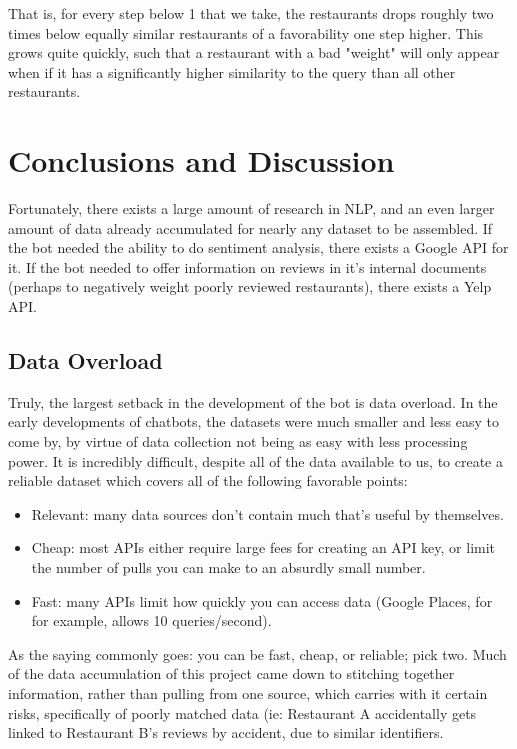 \documentclass{article}
\begin{document}
        That is, for every step below 1 that we take, the restaurants drops roughly two times below equally similar restaurants of a favorability one step higher. This grows quite quickly, such that a restaurant with a bad "weight" will only appear when if it has a significantly higher similarity to the query than all other restaurants.
    
\section{Conclusions and Discussion}
    Fortunately, there exists a large amount of research in NLP, and an even larger amount of data already accumulated for nearly any dataset to be assembled. If the bot needed the ability to do sentiment analysis, there exists a Google API for it. If the bot needed to offer information on reviews in it's internal documents (perhaps to negatively weight poorly reviewed restaurants), there exists a Yelp API.

    \subsection{Data Overload}
    Truly, the largest setback in the development of the bot is data overload. In the early developments of chatbots, the datasets were much smaller and less easy to come by, by virtue of data collection not being as easy with less processing power. It is incredibly difficult, despite all of the data available to us, to create a reliable dataset which covers all of the following favorable points:
    
    \begin{itemize}
        \item Relevant: many data sources don't contain much that's useful by themselves.
        \item Cheap: most APIs either require large fees for creating an API key, or limit the number of pulls you can make to an absurdly small number.
         \item Fast: many APIs limit how quickly you can access data (Google Places, for for example, allows 10 queries/second).
    \end{itemize}
    
    As the saying commonly goes: you can be fast, cheap, or reliable; pick two. Much of the data accumulation of this project came down to stitching together information, rather than pulling from one source, which carries with it certain risks, specifically of poorly matched data (ie: Restaurant A accidentally gets linked to Restaurant B’s reviews by accident, due to similar identifiers.
    
\end{document}
